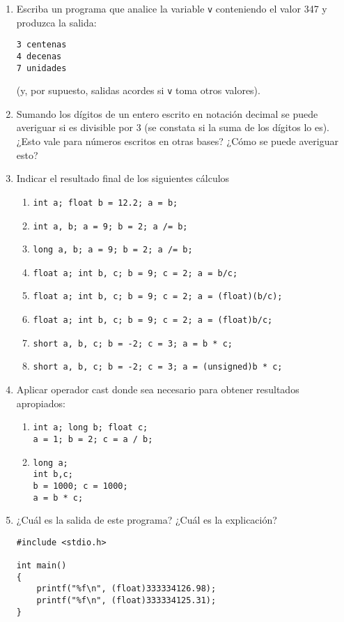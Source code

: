 \begin{enumerate}
\item Escriba un programa que analice la variable \lstinline{v} conteniendo el valor 347 y produzca la salida:
	\begin{lstlisting}
3 centenas
4 decenas
7 unidades
\end{lstlisting}
(y, por supuesto, salidas acordes si \lstinline{v} toma otros valores).
	\item Sumando los dígitos de un entero escrito en notación decimal se puede averiguar si es divisible por
3 (se constata si la suma de los dígitos lo es). ¿Esto vale para números escritos en otras bases? ¿Cómo
se puede averiguar esto?
	\item Indicar el resultado final de los siguientes cálculos
\begin{enumerate}[label=\alph*.]
\item \lstinline{int a; float b = 12.2; a = b;}
\item \lstinline{int a, b; a = 9; b = 2; a /= b;}
\item \lstinline{long a, b; a = 9; b = 2; a /= b;}
\item \lstinline{float a; int b, c; b = 9; c = 2; a = b/c;}
\item \lstinline{float a; int b, c; b = 9; c = 2; a = (float)(b/c);}
\item \lstinline{float a; int b, c; b = 9; c = 2; a = (float)b/c;}
\item \lstinline{short a, b, c; b = -2; c = 3; a = b * c;}
\item \lstinline{short a, b, c; b = -2; c = 3; a = (unsigned)b * c;}
\end{enumerate}
\item Aplicar operador cast donde sea necesario para obtener resultados apropiados:
	\begin{enumerate}[label=\alph*.] 
	\item 
	\begin{lstlisting}
int a; long b; float c;
a = 1; b = 2; c = a / b;
	\end{lstlisting} 

	\item 
	\begin{lstlisting}
long a; 
int b,c;
b = 1000; c = 1000;
a = b * c;
	\end{lstlisting}
	\end{enumerate}
\item ¿Cuál es la salida de este programa? ¿Cuál es la explicación?
\begin{lstlisting}
#include <stdio.h>

int main()
{
	printf("%f\n", (float)333334126.98);
	printf("%f\n", (float)333334125.31);
}
\end{lstlisting}
\end{enumerate}
